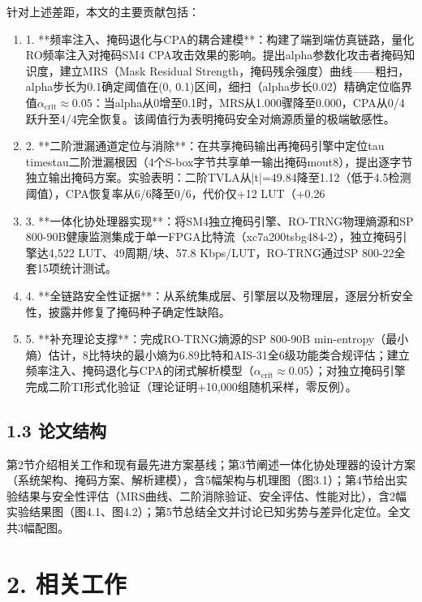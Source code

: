 \documentclass[journal]{IEEEtran}
\begin{document}
针对上述差距，本文的主要贡献包括：
\begin{enumerate}
\item 1. **频率注入、掩码退化与CPA的耦合建模**：构建了端到端仿真链路，量化RO频率注入对掩码SM4 CPA攻击效果的影响。提出alpha参数化攻击者掩码知识度，建立MRS（Mask Residual Strength，掩码残余强度）曲线——粗扫，alpha步长为0.1确定阈值在(0, 0.1)区间，细扫（alpha步长0.02）精确定位临界值$\alpha_{\text{crit}}\approx 0.05$：当alpha从0增至0.1时，MRS从1.000骤降至0.000，CPA从0/4跃升至4/4完全恢复。该阈值行为表明掩码安全对熵源质量的极端敏感性。

\item 2. **二阶泄漏通道定位与消除**：在共享掩码输出再掩码引擎中定位tau\\timestau二阶泄漏根因（4个S-box字节共享单一输出掩码mout8），提出逐字节独立输出掩码方案。实验表明：二阶TVLA从|t|=49.84降至1.12（低于4.5检测阈值），CPA恢复率从6/6降至0/6，代价仅+12 LUT（+0.26%

\item 3. **一体化协处理器实现**：将SM4独立掩码引擎、RO-TRNG物理熵源和SP 800-90B健康监测集成于单一FPGA比特流（xc7a200tsbg484-2），独立掩码引擎达4,522 LUT、49周期/块、57.8 Kbps/LUT，RO-TRNG通过SP 800-22全套15项统计测试。

\item 4. **全链路安全性证据**：从系统集成层、引擎层以及物理层，逐层分析安全性，披露并修复了掩码种子确定性缺陷。

\item 5. **补充理论支撑**：完成RO-TRNG熵源的SP 800-90B min-entropy（最小熵）估计，8比特块的最小熵为6.89比特和AIS-31全6级功能类合规评估；建立频率注入、掩码退化与CPA的闭式解析模型（$\alpha_{\text{crit}}\approx 0.05$）；对独立掩码引擎完成二阶TI形式化验证（理论证明+10,000组随机采样，零反例）。
\end{enumerate}

\subsection{1.3 论文结构}

第2节介绍相关工作和现有最先进方案基线；第3节阐述一体化协处理器的设计方案（系统架构、掩码方案、解析建模），含5幅架构与机理图（图3.1）；第4节给出实验结果与安全性评估（MRS曲线、二阶消除验证、安全评估、性能对比），含2幅实验结果图（图4.1、图4.2）；第5节总结全文并讨论已知劣势与差异化定位。全文共3幅配图。

%


\section{2. 相关工作}
\end{document}
